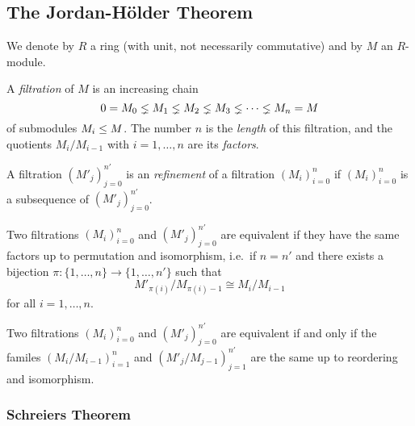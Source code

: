 \subsection{The Jordan-Hölder Theorem}


\begin{conventions}
  We denote by $R$ a ring (with unit, not necessarily commutative) and by $M$ an $R$-module.
\end{conventions}


\begin{definition}
  \label{definition: filtration}
  A \emph{filtration} of $M$ is an increasing chain
  \[
                0
    =           M_0
    \lneq  M_1
    \lneq  M_2
    \lneq  M_3
    \lneq  \dotsb
    \lneq  M_n
    =           M
  \]
  of submodules $M_i \leq M$.
  The number $n$ is the \emph{length} of this filtration, and the quotients $M_i/M_{i-1}$ with $i = 1, \dotsc, n$ are its \emph{factors}.
\end{definition}


\begin{definition}
  A filtration $(M'_j)_{j=0}^{n'}$ is an \emph{refinement} of a filtration $(M_i)_{i=0}^n$ if $(M_i)_{i=0}^n$ is a subsequence of $(M'_j)_{j=0}^{n'}$.
\end{definition}


\begin{definition}
  Two filtrations $(M_i)_{i=0}^n$ and $(M'_j)_{j=0}^{n'}$ are equivalent if they have the same factors up to permutation and isomorphism, i.e.\ if $n = n'$ and there exists a bijection $\pi \colon \{1, \dotsc, n\} \to \{1, \dotsc, n'\}$ such that
  \[
          M'_{\pi(i)} / M_{\pi(i)-1}
    \cong M_i / M_{i-1}
  \]
  for all $i = 1, \dotsc, n$.
\end{definition}


\begin{remark}
  Two filtrations $(M_i)_{i=0}^n$ and $(M'_j)_{j=0}^{n'}$ are equivalent if and only if the familes $(M_i/M_{i-1})_{i=1}^n$ and $(M'_j/M_{j-1})_{j=1}^{n'}$ are the same up to reordering and isomorphism.
\end{remark}







\subsubsection{Schreiers Theorem}


